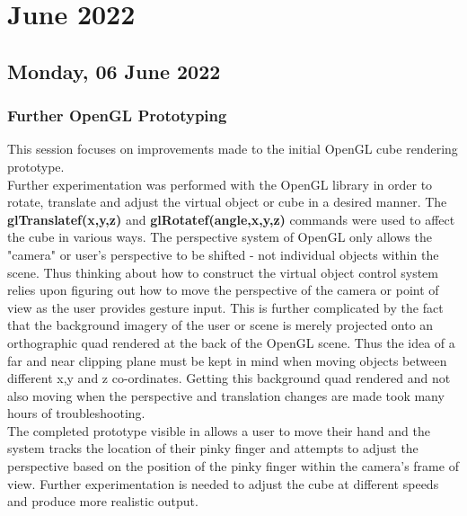 \chapter[2022 June]{June 2022}

\section[2022/06/06]{Monday, 06 June 2022}

\subsection{Further OpenGL Prototyping}

This session focuses on improvements made to the initial OpenGL cube rendering prototype. \\

Further experimentation was performed with the OpenGL library in order to rotate, translate and adjust the virtual object or cube in a desired manner. The \textbf{glTranslatef(x,y,z)} and \textbf{glRotatef(angle,x,y,z)} commands were used to affect the cube in various ways. The perspective system of OpenGL only allows the "camera" or user's perspective to be shifted - not individual objects within the scene. Thus thinking about how to construct the virtual object control system relies upon figuring out how to move the perspective of the camera or point of view as the user provides gesture input. This is further complicated by the fact that the background imagery of the user or scene is merely projected onto an orthographic quad rendered at the back of the OpenGL scene. Thus the idea of a far and near clipping plane must be kept in mind when moving objects between different x,y and z co-ordinates. Getting this background quad rendered and not also moving when the perspective and translation changes are made took many hours of troubleshooting. \\

The completed prototype visible in  allows a user to move their hand and the system tracks the location of their pinky finger and attempts to adjust the perspective based on the position of the pinky finger within the camera's frame of view. Further experimentation is needed to adjust the cube at different speeds and produce more realistic output. \\

